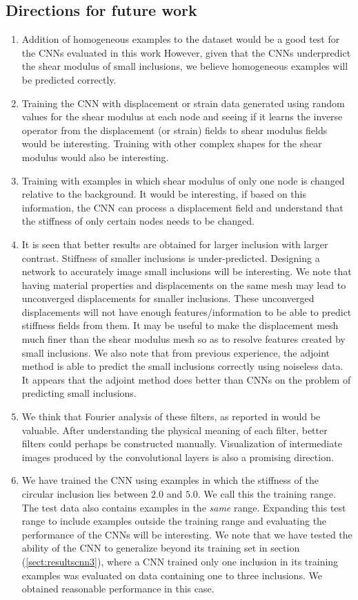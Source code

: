 \documentclass[12pt]{article}
\begin{document}
\subsection{Directions for future work}
\begin{enumerate}
\item{Addition of homogeneous examples to the dataset would be a good test for the CNNs evaluated in this work However, given that the CNNs underpredict the shear modulus of small inclusions, we believe homogeneous examples will be predicted correctly.}
\item{Training the CNN with displacement or strain data generated using random values for the shear modulus at each node and seeing if it learns the inverse operator from the displacement (or strain) fields to shear modulus fields would be interesting. Training with other complex shapes for the shear modulus would also be interesting.}
\item{Training with examples in which shear modulus of only one node is changed relative to the background. It would be interesting, if based on this information, the CNN can process a displacement field and understand that the stiffness of only certain nodes needs to be changed.}
\item{It is seen that better results are obtained for larger inclusion with larger contrast. Stiffness of smaller inclusions is under-predicted. Designing a network to accurately image small inclusions will be interesting. We note that having material properties and displacements on the same mesh may lead to unconverged displacements for smaller inclusions. These unconverged displacements will not have enough features/information to be able to predict stiffness fields from them. It may be useful to make the displacement mesh much finer than the shear modulus mesh so as to resolve features created by small inclusions. We also note that from previous experience, the adjoint method \cite{paper:oberai2003,paper:gokhale2008,paper:goenezen2011} is able to predict the small inclusions correctly using noiseless data. It appears that the adjoint method does better than CNNs on the problem of predicting small inclusions.}
\item{We think that Fourier analysis of these filters, as reported in \cite{paper:pateloberai2019} would be valuable. After understanding the physical meaning of each filter, better filters could perhaps be constructed manually. Visualization of intermediate images produced by the convolutional layers is also a promising direction.}
\item{We have trained the CNN using examples in which the stiffness of the circular inclusion lies between $2.0$ and $5.0$. We call this the training range. The test data also contains examples in the \textit{same} range. Expanding this test range to include examples outside the training range and evaluating the performance of the CNNs will be interesting. We note that we have tested the ability of the CNN to generalize beyond its training set in section (\ref{sect:resultscnn3}), where a CNN trained only one inclusion in its training examples was evaluated on data containing one to three inclusions. We obtained reasonable performance in this case.}

\end{enumerate}
\end{document}
